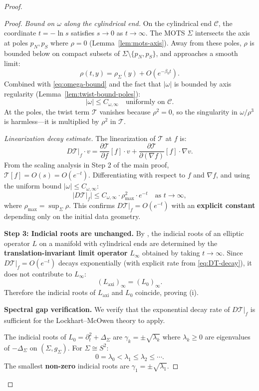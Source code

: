 \documentclass[12pt]{article}
\theoremstyle{plain}
\theoremstyle{definition}
\theoremstyle{remark}
\begin{document}
\begin{proof}
\begin{proof}
\textit{Bound on $\omega$ along the cylindrical end.} On the cylindrical end $\mathcal{C}$, the coordinate $t = -\ln s$ satisfies $s \to 0$ as $t \to \infty$. The MOTS $\Sigma$ intersects the axis at poles $p_N, p_S$ where $\rho = 0$ (Lemma~\ref{lem:mots-axis}). Away from these poles, $\rho$ is bounded below on compact subsets of $\Sigma \setminus \{p_N, p_S\}$, and approaches a smooth limit:
\[
\rho(t, y) = \rho_\Sigma(y) + O(e^{-\beta_0 t}).
\]
Combined with \eqref{eq:omega-bound} and the fact that $|\omega|$ is bounded by axis regularity (Lemma~\ref{lem:twist-bound-poles}):
\[
|\omega| \leq C_{\omega,\infty} \quad \text{uniformly on } \mathcal{C}.
\]
At the poles, the twist term $\mathcal{T}$ vanishes because $\rho^2 = 0$, so the singularity in $\omega/\rho^3$ is harmless---it is multiplied by $\rho^2$ in $\mathcal{T}$.

\textit{Linearization decay estimate.} The linearization of $\mathcal{T}$ at $f$ is:
\[
D\mathcal{T}|_f \cdot v = \frac{\partial \mathcal{T}}{\partial f}[f] \cdot v + \frac{\partial \mathcal{T}}{\partial (\nabla f)}[f] \cdot \nabla v.
\]
From the scaling analysis in Step 2 of the main proof, $\mathcal{T}[f] = O(s) = O(e^{-t})$. Differentiating with respect to $f$ and $\nabla f$, and using the uniform bound $|\omega| \leq C_{\omega,\infty}$:
\begin{equation}\label{eq:DT-decay}
|D\mathcal{T}|_f| \leq C_{\omega,\infty} \cdot \rho_{\max}^2 \cdot e^{-t} \quad \text{as } t \to \infty,
\end{equation}
where $\rho_{\max} = \sup_\Sigma \rho$. This confirms $D\mathcal{T}|_f = O(e^{-t})$ with an \textbf{explicit constant} depending only on the initial data geometry.

\textbf{Step 3: Indicial roots are unchanged.}
By \cite[Theorem 6.1]{lockhartmccowen1985}, the indicial roots of an elliptic operator $L$ on a manifold with cylindrical ends are determined by the \textbf{translation-invariant limit operator} $L_\infty$ obtained by taking $t \to \infty$. Since $D\mathcal{T}|_f = O(e^{-t})$ decays exponentially (with explicit rate from \eqref{eq:DT-decay}), it does not contribute to $L_\infty$:
\[
(L_{\mathrm{axi}})_\infty = (L_0)_\infty.
\]
Therefore the indicial roots of $L_{\mathrm{axi}}$ and $L_0$ coincide, proving (i).

\textbf{Spectral gap verification.} We verify that the exponential decay rate of $D\mathcal{T}|_f$ is sufficient for the Lockhart--McOwen theory to apply. 

The indicial roots of $L_0 = \partial_t^2 + \Delta_\Sigma$ are $\gamma_k = \pm\sqrt{\lambda_k}$ where $\lambda_k \geq 0$ are eigenvalues of $-\Delta_\Sigma$ on $(\Sigma, g_\Sigma)$. For $\Sigma \cong S^2$:
\[
0 = \lambda_0 < \lambda_1 \leq \lambda_2 \leq \cdots.
\]
The smallest \textbf{non-zero} indicial roots are $\gamma_1 = \pm\sqrt{\lambda_1}$.


\end{proof}
\end{proof}
\end{document}

